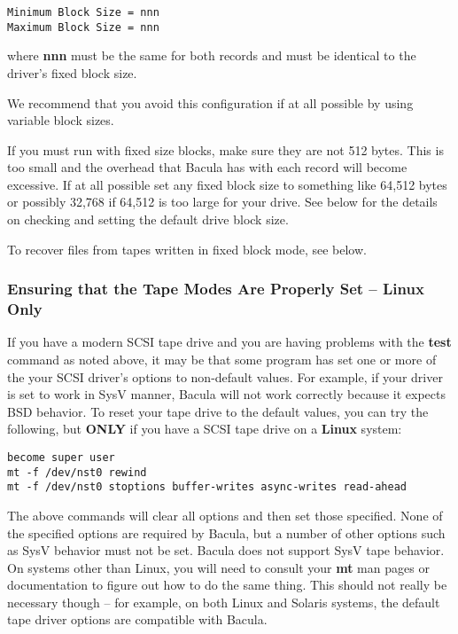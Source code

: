 \footnotesize
\begin{verbatim}
Minimum Block Size = nnn
Maximum Block Size = nnn
\end{verbatim}
\normalsize

where {\bf nnn} must be the same for both records and must be identical to the
driver's fixed block size. 

We recommend that you avoid this configuration if at all possible by using
variable block sizes. 

If you must run with fixed size blocks, make sure they are not 512 bytes. This
is too small and the overhead that Bacula has with each record will become
excessive. If at all possible set any fixed block size to something like
64,512 bytes or possibly 32,768 if 64,512 is too large for your drive. See
below for the details on checking and setting the default drive block size. 

To recover files from tapes written in fixed block mode, see below. 
\label{TapeModes}

\subsubsection*{Ensuring that the Tape Modes Are Properly Set -- {\bf Linux
Only}}

If you have a modern SCSI tape drive and you are having problems with the {\bf
test} command as noted above, it may be that some program has set one or more
of the your SCSI driver's options to non-default values. For example, if your
driver is set to work in SysV manner, Bacula will not work correctly because
it expects BSD behavior. To reset your tape drive to the default values, you
can try the following, but {\bf ONLY} if you have a SCSI tape drive on a {\bf
Linux} system: 

\footnotesize
\begin{verbatim}
become super user
mt -f /dev/nst0 rewind
mt -f /dev/nst0 stoptions buffer-writes async-writes read-ahead
\end{verbatim}
\normalsize

The above commands will clear all options and then set those specified. None
of the specified options are required by Bacula, but a number of other options
such as SysV behavior must not be set. Bacula does not support SysV tape
behavior. On systems other than Linux, you will need to consult your {\bf mt}
man pages or documentation to figure out how to do the same thing. This should
not really be necessary though -- for example, on both Linux and Solaris
systems, the default tape driver options are compatible with Bacula. 

